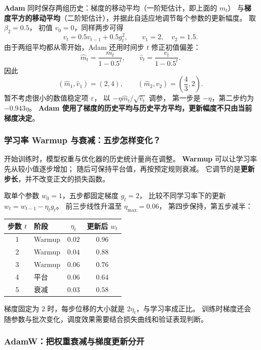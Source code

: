 \textbf{Adam} 同时保存两组历史：梯度的移动平均（一阶矩估计，即上面的 $m_t$）
与\textbf{梯度平方的移动平均}（二阶矩估计），并据此自适应地调节每个参数的更新幅度。
取 $\beta_2=0.5$，
初值 $v_0=0$，同样两步可得
\[
v_t=0.5v_{t-1}+0.5g_t^2,\qquad
v_1=2,\quad v_2=1.5.
\]
由于两组平均都从零开始，Adam 还用时间步 $t$ 修正初值偏差：
\[
\widehat{m}_t=\frac{m_t}{1-0.5^t},\qquad
\widehat{v}_t=\frac{v_t}{1-0.5^t}.
\]
因此
\[
(\widehat{m}_1,\widehat{v}_1)=(2,4),\qquad
(\widehat{m}_2,\widehat{v}_2)=\left(\frac43,2\right).
\]
暂不考虑很小的数值稳定项 $\varepsilon$，
以 $-\eta\widehat{m}_t/\sqrt{\widehat{v}_t}$ 调参，
第一步是 $-\eta$，第二步约为 $-0.943\eta$。
\textbf{Adam 使用了梯度的历史平均与历史平方平均，更新幅度不只由当前梯度决定}。

\subsubsection{学习率 Warmup 与衰减：五步怎样变化？}
\label{concept:lr-warmup}

开始训练时，模型权重与优化器的历史统计量尚在调整。
\textbf{Warmup} 可以让学习率先从较小值逐步增加；
随后可保持平台值，再按预定规则衰减。
它调节的是\textbf{更新步长}，并不改变正文的损失函数。

取单个参数 $w_0=1$，五步都固定梯度 $g_t=2$，
比较不同学习率下的更新 $w_t=w_{t-1}-\eta_t g_t$。
前三步线性升温至 $\eta_{\max}=0.06$，
第四步保持，第五步减半：
\begin{center}\small
{}
\begin{tabularx}{\linewidth}{@{}cXcc@{}}
\toprule
步数 $t$ & 阶段 & $\eta_t$ & 更新后 $w_t$\\\midrule
1 & Warmup & $0.02$ & $0.96$\\
2 & Warmup & $0.04$ & $0.88$\\
3 & Warmup & $0.06$ & $0.76$\\
4 & 平台 & $0.06$ & $0.64$\\
5 & 衰减 & $0.03$ & $\boxed{0.58}$\\
\bottomrule
\end{tabularx}
\end{center}
梯度固定为 $2$ 时，每步位移的大小就是 $2\eta_t$，与学习率成正比。
训练时梯度还会随参数与批次变化，调度效果需要结合损失曲线和验证表现判断。

\subsubsection{AdamW：把权重衰减与梯度更新分开}
\label{concept:adamw}

